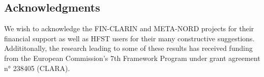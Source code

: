 \documentclass{llncs}
\begin{document}
\subsection*{Acknowledgments}
We wish to acknowledge the FIN-CLARIN and META-NORD projects for their financial support 
as well as HFST users for their many constructive suggestions. Addititonally, the research leading to some of these results has received funding from the European Commission’s 7th Framework Program under grant agreement n° 238405 (CLARA).





\end{document}
